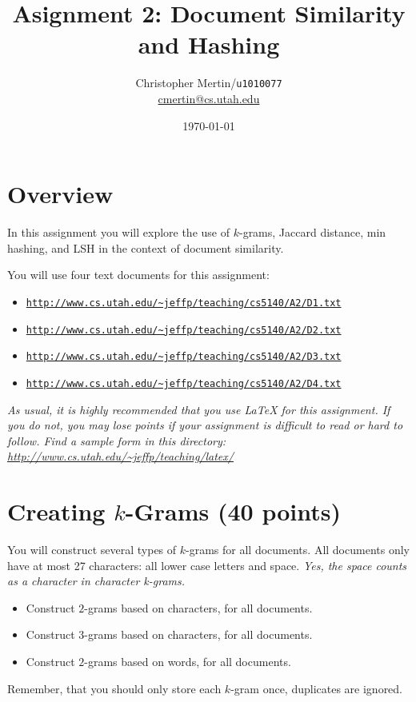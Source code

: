 \documentclass[11pt]{article}
\title{Asignment 2: Document Similarity and Hashing}
\author{Christopher Mertin/\verb~u1010077~\\\url{cmertin@cs.utah.edu}}
\date{\today}
\begin{document}
\maketitle


\section*{Overview}

In this assignment you will explore the use of $k$-grams, Jaccard distance, min hashing, and LSH in the context of document similarity.  

You will use four text documents for this assignment:
\begin{itemize} \denselist
\item \href{http://www.cs.utah.edu/~jeffp/teaching/cs5140/A2/D1.txt}{\texttt{http://www.cs.utah.edu/\~{}jeffp/teaching/cs5140/A2/D1.txt}}
\item \href{http://www.cs.utah.edu/~jeffp/teaching/cs5140/A2/D2.txt}{\texttt{http://www.cs.utah.edu/\~{}jeffp/teaching/cs5140/A2/D2.txt}}
\item \href{http://www.cs.utah.edu/~jeffp/teaching/cs5140/A2/D3.txt}{\texttt{http://www.cs.utah.edu/\~{}jeffp/teaching/cs5140/A2/D3.txt}}
\item \href{http://www.cs.utah.edu/~jeffp/teaching/cs5140/A2/D4.txt}{\texttt{http://www.cs.utah.edu/\~{}jeffp/teaching/cs5140/A2/D4.txt}}
\end{itemize}

\vspace{.1in}

\emph{As usual, it is highly recommended that you use LaTeX for this assignment.  If you do not, you may lose points if your assignment is difficult to read or hard to follow.  Find a sample form in this directory:
\url{http://www.cs.utah.edu/~jeffp/teaching/latex/}}


\section{Creating $k$-Grams (40 points)}

You will construct several types of $k$-grams for all documents.  All documents only have at most 27 characters: all lower case letters and space.    \emph{Yes, the space counts as a character in character k-grams.}
\begin{itemize} \denselist
\item[\s{[G1]}] Construct $2$-grams based on characters, for all documents.  
\item[\s{[G2]}] Construct $3$-grams based on characters, for all documents.
\item[\s{[G3]}] Construct $2$-grams based on words, for all documents.  
\end{itemize}
Remember, that you should only store each $k$-gram once, duplicates are ignored.  
\end{document}

